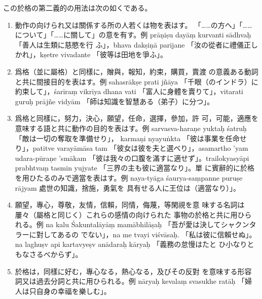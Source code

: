\begin{enumerate}[label=(\arabic*)]
この於格の第二義的の用法は次の如くである。
\begin{enumerate}[label=(\alph*)]
\item 動作の向けられ又は關係する所の人若くは物を表はす。
「……の方へ」「……について」「……に關して」の意を有す。例
prāṇiṣu dayāṃ kurvanti sādhvaḥ 「善人は生類に慈愍を行
ふ」，bhava dakṣiṇā parijane 「汝の從者に禮儀正しかれ」，kṣetre
vivadante 「彼等は田地を爭ふ」。
\item 爲格（並に屬格）と同樣に，贈與，報知，約束，購買，賣渡
の意義ある動詞と共に間接目的を表はす。例 sahasrākṣe prati\-%
jñāya 「千眼（のインドラ）に約束して」，śarīraṃ vikrīya dhana\-%
vati 「富人に身體を賣りて」，vitarati guruḥ prājñe vidyām
「師は知識を智慧ある（弟子）に分つ」。
\item 爲格と同樣に，努力，決心，願望，任命，選擇，參加，許
可，可能，適應を意味する語と共に動作の目的を表はす。例
sarvasva-haraṇe yuktaḥ śatruḥ 「敵は一切の奪取を準備せり」，
karmaṇi nyayuṅkta 「彼は事業を任命せり」，patitve varayāmāsa
tam 「彼女は彼を夫と選べり」，asamartho 'yam udara-pūraṇe
'smākam 「彼は我々の口腹を滿すに適せず」。trailokyasyāpi
prabhtvaṃ tasmin yujyate 「三界の主も彼に適當なり」。單
に賓辭的に於格を用ひたるのみで適當を表はす。例 naya-tyāga\-%
śaurya-saṃpanne puruṣe rājyam 處世の知識，捨施，勇氣を
具有せる人に王位は（適當なり）」。
\item 願望，專心，尊敬，友情，信賴，同情，侮蔑，等閑視を意
味する名詞は屢々（屬格と同じく）これらの感情の向けられた
事物の於格と共に用ひられる。例 na kalu Śakuntalāyāṃ
mamābhilāṣaḥ 「吾が愛は決してシャクンタラーに對してあるの
でない」，na me tvayi viśvāsaḥ. 「私は彼に信賴せぬ」。na
laghuṣv api kartavyeṣv anādaraḥ kāryaḥ 「義務の怠慢はたと
ひ小なりともなさるべからず」。
\item 於格は，同樣に好む，專心なる，熱心なる，及びその反對
を意味する形容詞又は過去分詞と共に用ひられる。例 nāryaḥ
kevalaṃ svasukhe ratāḥ 「婦人は只自身の幸福を樂しむ」。
\end{enumerate}
\end{enumerate}

